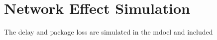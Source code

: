 \section{Network Effect Simulation}

The delay and package loss are simulated in the mdoel and included